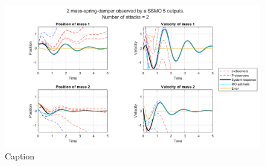 \begin{figure}
    \centering
    \includegraphics[width=\linewidth]{report/Figures/symplot_5o2a}
    \caption{Caption}
    \label{fig:enter-label}
\end{figure}